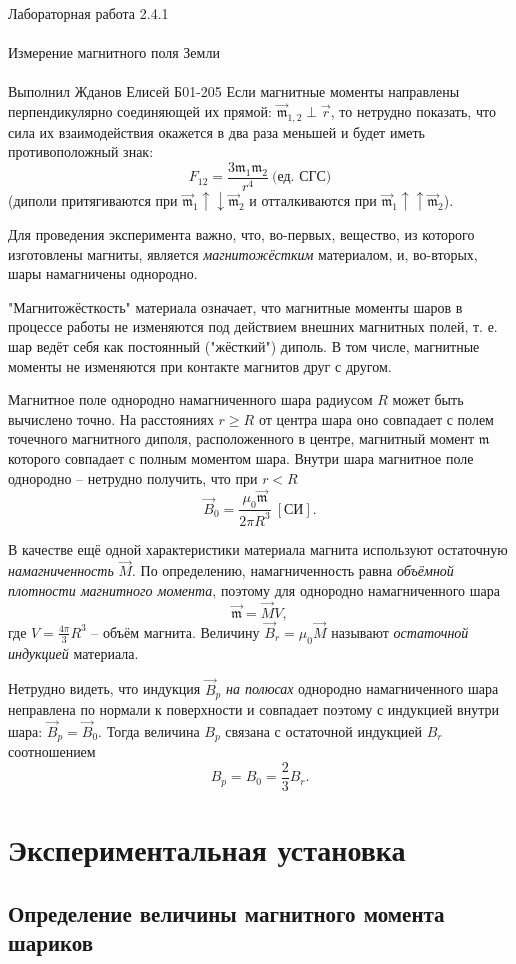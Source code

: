 \documentclass{astroedu-lab}
\begin{document}
\begin{problem}{\huge Лабораторная работа 2.4.1\\\\Измерение магнитного поля Земли\\\\Выполнил Жданов Елисей Б01-205}
Если магнитные моменты направлены перпендикулярно соединяющей их прямой: $\vec{\mathfrak{m}}_{1,2}\perp\vec{r}$, то нетрудно показать, что сила их взаимодействия окажется в два раза меньшей и будет иметь противоположный знак:\[F_{12}=\frac{3\mathfrak{m}_1\mathfrak{m}_2}{r^4}\ \text{(ед. СГС)}\](диполи притягиваются при $\vec{\mathfrak{m}}_1\uparrow\downarrow\vec{\mathfrak{m}}_2$ и отталкиваются при $\vec{\mathfrak{m}}_1\uparrow\uparrow\vec{\mathfrak{m}}_2$).

Для проведения эксперимента важно, что, во-первых, вещество, из которого изготовлены магниты, является \textit{магнитожёстким} материалом, и, во-вторых, шары намагничены однородно.

"Магнитожёсткость" материала означает, что магнитные моменты шаров в процессе работы не изменяются под действием внешних магнитных полей, т. е. шар ведёт себя как постоянный ("жёсткий") диполь. В том числе, магнитные моменты не изменяются при контакте магнитов друг с другом.

Магнитное поле однородно намагниченного шара радиусом $R$ может быть вычислено точно. На расстояниях $r\geq R$ от центра шара оно совпадает с полем точечного магнитного диполя, расположенного в центре, магнитный момент $\mathfrak{m}$ которого совпадает с полным моментом шара. Внутри шара магнитное поле однородно -- нетрудно получить, что при $r < R$\[\vec{B}_0=\frac{\mu_0\vec{\mathfrak{m}}}{2\pi R^3}\ \left[\text{СИ}\right].\]

В качестве ещё одной характеристики материала магнита используют остаточную \textit{намагниченность} $\vec{M}$. По определению, намагниченность равна \textit{объёмной плотности магнитного момента}, поэтому для однородно намагниченного шара\[\vec{\mathfrak{m}}=\vec{M}V,\]где $V=\frac{4\pi}{3}R^3$ -- объём магнита. Величину $\vec{B}_r=\mu_0\vec{M}$ называют \textit{остаточной индукцией} материала.

Нетрудно видеть, что индукция $\vec{B}_p$ \textit{на полюсах} однородно намагниченного шара неправлена по нормали к поверхности и совпадает поэтому с индукцией внутри шара: $\vec{B}_p=\vec{B}_0$. Тогда величина $B_p$ связана с остаточной индукцией $B_r$ соотношением\[B_p=B_0=\frac{2}{3}B_r.\]

\section{Экспериментальная установка}

\subsection{Определение величины магнитного момента шариков}


\end{problem}
\end{document}
